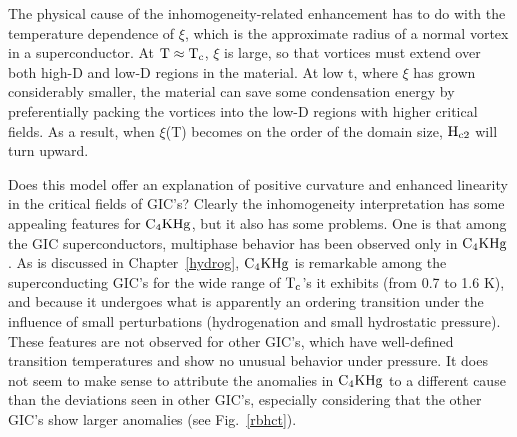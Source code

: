         The  physical cause of  the inhomogeneity-related enhancement has to
do with the  temperature  dependence   of  $\xi$, which  is the approximate
radius of a normal  vortex in  a  superconductor.\cite{tinkham80} At $\rm T
\approx T_c$, $\xi$ is large, so that vortices must extend over both high-D
and low-D   regions  in the  material.  At  low t,   where $\xi$  has grown
considerably smaller, the  material can  save some  condensation energy  by
preferentially    packing  the vortices into  the   low-D  regions with higher
critical fields.  As  a result, when  $\xi$(T)  becomes on the order of the
domain size, $\rm H_{c2}$ will turn upward.\cite{carter81}

         Does this   model offer an explanation   of positive curvature and
enhanced   linearity in  the  critical   fields   of  GIC's?   Clearly  the
inhomogeneity interpretation has some appealing  features for $\rm C_4KHg$,
but it also has some problems.  One is that  among the GIC superconductors,
multiphase  behavior   has been  observed  only in   $\rm C_4KHg$.   As  is
discussed in  Chapter~\ref{hydrog},  $\rm C_4KHg$ is  remarkable  among the
superconducting GIC's for the wide range of $\rm T_c$'s  it  exhibits (from
0.7 to  1.6 K), and because it   undergoes  what is  apparently an ordering
transition     under     the    influence     of     small    perturbations
(hydrogenation\cite{Z234} and  small  hydrostatic pressure\cite{delong83}).
These features are  not observed  for other  GIC's, which have well-defined
transition      temperatures   and  show   no     unusual   behavior  under
pressure.\cite{iye83,delong83} It does not seem to make  sense to attribute
the anomalies in $\rm C_4KHg$ to a different cause than the deviations seen
in other GIC's, especially  considering that the other  GIC's  show  larger
anomalies (see Fig.~\ref{rbhct}).

